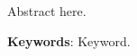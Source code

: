 


Abstract here.


   
     \textbf{Keywords}: Keyword.





     \setcounter{page}{4}  

  \newpage